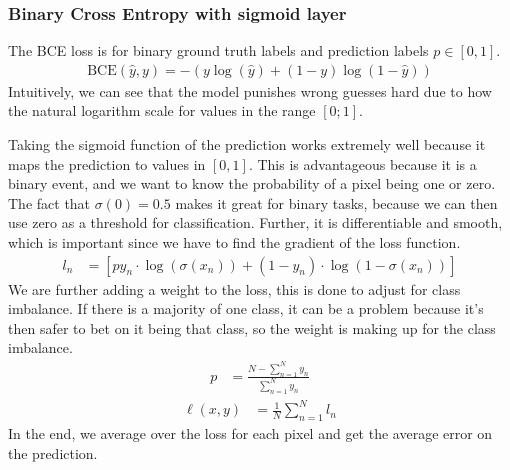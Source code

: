 \documentclass[a4paper,12pt]{article}
\begin{document}








\subsubsection{Binary Cross Entropy with sigmoid layer}
The BCE loss is for binary ground truth labels and prediction labels $p \in [0,1]$.
\begin{align}
\text{BCE}(\hat{y}, y) = - \left( y \log(\hat{y}) + (1 - y) \log(1 - \hat{y}) \right)
\end{align}
Intuitively, we can see that the model punishes wrong guesses hard due to how the natural logarithm scale for values in the range $[0;1]$.




Taking the sigmoid function of the prediction works extremely well because it maps the prediction to values in $[0,1]$. This is advantageous because it is a binary event, and we want to know the probability of a pixel being one or zero. The fact that $\sigma(0)=0.5$ makes it great for binary tasks, because we can then use zero as a threshold for classification. Further, it is differentiable and smooth, which is important since we have to find the gradient of the loss function.
\begin{align}
l_{n}&=\left[p y_{n} \cdot \log (\sigma\left(x_{n}\right))+\left(1-y_{n}\right) \cdot \log \left(1-\sigma\left(x_{n}\right)\right)\right]
\end{align}
We are further adding a weight to the loss, this is done to adjust for class imbalance. If there is a majority of one class, it can be a problem because it's then safer to bet on it being that class, so the weight is making up for the class imbalance.
\begin{align}
p &= \frac{N-\sum^{N}_{n=1} y_n }{\sum^{N}_{n=1} y_n}
\end{align}
\begin{align}
\ell(x, y)&=\frac{1}{N} \sum^{N}_{n=1} l_{n}
\end{align}
In the end, we average over the loss for each pixel and get the average error on the prediction.
\end{document}
